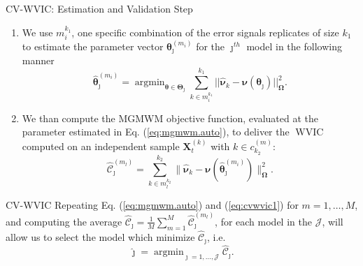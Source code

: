\documentclass[envcountsect,usenames,dvipsnames]{beamer}
\DeclareMathOperator*{\argmin}{argmin}
\DeclareMathOperator*{\WVIC}{WVIC}
\theoremstyle{mystyle}
\begin{document}
\begin{frame}{CV-WVIC: Estimation and Validation Step}
    \begin{enumerate}
        \item  We use $m_i^{k_1}$, one specific combination of the error signals replicates of size $k_1$ to estimate the parameter vector $\bm{\theta}_{\jmath}^{(m_i)}$ for the $\jmath^{th}$ model in the following manner 
%
        \begin{equation}
	        \hat{\bm{\theta}}_{\jmath}^{(m_i)} = \argmin_{\bm{\theta} \in \bm{\Theta}_{\jmath}} \sum^{k_1}_{k \in m_i^{k_1}} || \hat{\bm{\nu}}_{k} - {\bm{\nu}}(\bm{\theta}_{\jmath})||^2_{\bm{\Omega}}.
	    \label{eq:mgmwm.auto}
        \end{equation}
        \item We than compute the MGMWM objective function, evaluated at the parameter estimated in Eq. (\ref{eq:mgmwm.auto}), to deliver the $\WVIC$ computed on an independent sample $\bm{X}^{(k)}_t$ with $k \in c^{(m)}_{k_2}$:
%
\begin{equation}
	\widehat{\mathcal{C}}^{(m_l)}_{\jmath}= \sum^{k_2}_{k \in m_l^{k_2}} \| \hat{\bm{\nu}}_{k} - {\bm{\nu}}(\hat{\bm{\theta}}^{(m_i)}_{\jmath})\|_{\bm{\Omega}}^2.
	\label{eq:cvwvic1}
\end{equation}
    \end{enumerate}
\end{frame}

\begin{frame}{CV-WVIC}
    Repeating Eq. (\ref{eq:mgmwm.auto}) and (\ref{eq:cvwvic1}) for $m = 1, \ldots, M$, and computing the average $\widehat{\mathcal{C}}_{\jmath} = \frac{1}{M} \sum^M_{m = 1}\widehat{\mathcal{C}}^{(m_l)}_{\jmath}$, for each model in the $\mathcal{J}$, will allow us to select the model which minimize $\widehat{\mathcal{C}}_{\jmath}$, i.e.
\begin{equation}
	\hat{\jmath} = \argmin_{\jmath = 1,\ldots, \mathcal{J}} \widehat{\mathcal{C}}_{\jmath}.
	\label{eq:cvwvic2}
\end{equation}
\end{frame}
\end{document}

